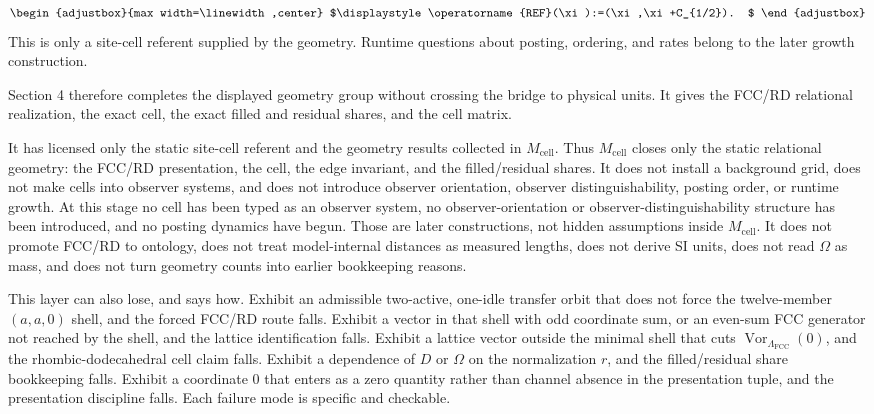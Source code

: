 \begin{equation*}
\begin{adjustbox}{max width=\linewidth,center}
$\displaystyle
\operatorname{REF}(\xi):=(\xi,\xi+C_{1/2}).
$
\end{adjustbox}
\end{equation*}
This is only a site-cell referent supplied by the geometry. Runtime questions about posting, ordering, and rates belong to the later growth construction.

Section 4 therefore completes the displayed geometry group without crossing the bridge to physical units. It gives the FCC/RD relational realization, the exact cell, the exact filled and residual shares, and the cell matrix.

It has licensed only the static site-cell referent and the geometry results collected in \(M_{\mathrm{cell}}\). Thus \(M_{\mathrm{cell}}\) closes only the static relational geometry: the FCC/RD presentation, the cell, the edge invariant, and the filled/residual shares. It does not install a background grid, does not make cells into observer systems, and does not introduce observer orientation, observer distinguishability, posting order, or runtime growth. At this stage no cell has been typed as an observer system, no observer-orientation or observer-distinguishability structure has been introduced, and no posting dynamics have begun. Those are later constructions, not hidden assumptions inside \(M_{\mathrm{cell}}\). It does not promote FCC/RD to ontology, does not treat model-internal distances as measured lengths, does not derive SI units, does not read \(\Omega\) as mass, and does not turn geometry counts into earlier bookkeeping reasons.

This layer can also lose, and says how. Exhibit an admissible two-active, one-idle transfer orbit that does not force the twelve-member \((a,a,0)\) shell, and the forced FCC/RD route falls. Exhibit a vector in that shell with odd coordinate sum, or an even-sum FCC generator not reached by the shell, and the lattice identification falls. Exhibit a lattice vector outside the minimal shell that cuts \(\operatorname{Vor}_{\Lambda_{\mathrm{FCC}}}(0)\), and the rhombic-dodecahedral cell claim falls. Exhibit a dependence of \(D\) or \(\Omega\) on the normalization \(r\), and the filled/residual share bookkeeping falls. Exhibit a coordinate \(0\) that enters as a zero quantity rather than channel absence in the presentation tuple, and the presentation discipline falls. Each failure mode is specific and checkable.

